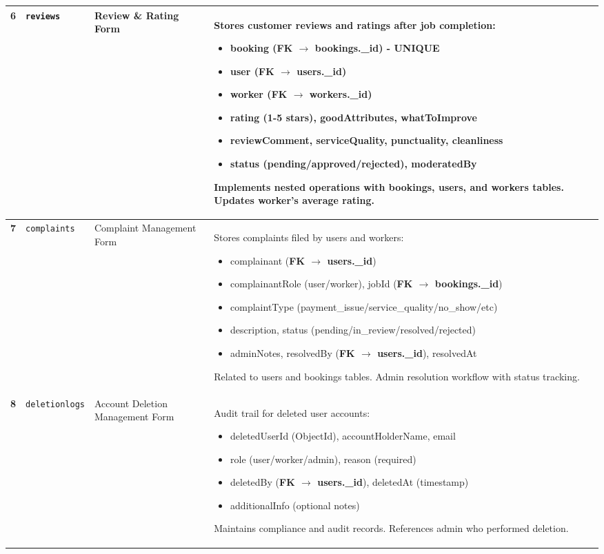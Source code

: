 \documentclass[12pt,a4paper]{article}
\begin{document}
\begin{longtable}{|>{\centering\arraybackslash}p{1cm}|p{3.5cm}|p{4.5cm}|p{6cm}|}
\textbf{6} & \texttt{reviews} & Review \& Rating Form & Stores customer reviews and ratings after job completion:
\begin{itemize}
\item booking (\textbf{FK $\rightarrow$ bookings.\_id}) - UNIQUE
\item user (\textbf{FK $\rightarrow$ users.\_id})
\item worker (\textbf{FK $\rightarrow$ workers.\_id})
\item rating (1-5 stars), goodAttributes, whatToImprove
\item reviewComment, serviceQuality, punctuality, cleanliness
\item status (pending/approved/rejected), moderatedBy
\end{itemize}
Implements nested operations with bookings, users, and workers tables. Updates worker's average rating. \\
\hline

\rowcolor{lightgray}
\textbf{7} & \texttt{complaints} & Complaint Management Form & Stores complaints filed by users and workers:
\begin{itemize}
\item complainant (\textbf{FK $\rightarrow$ users.\_id})
\item complainantRole (user/worker), jobId (\textbf{FK $\rightarrow$ bookings.\_id})
\item complaintType (payment\_issue/service\_quality/no\_show/etc)
\item description, status (pending/in\_review/resolved/rejected)
\item adminNotes, resolvedBy (\textbf{FK $\rightarrow$ users.\_id}), resolvedAt
\end{itemize}
Related to users and bookings tables. Admin resolution workflow with status tracking. \\
\hline

\textbf{8} & \texttt{deletionlogs} & Account Deletion Management Form & Audit trail for deleted user accounts:
\begin{itemize}
\item deletedUserId (ObjectId), accountHolderName, email
\item role (user/worker/admin), reason (required)
\item deletedBy (\textbf{FK $\rightarrow$ users.\_id}), deletedAt (timestamp)
\item additionalInfo (optional notes)
\end{itemize}
Maintains compliance and audit records. References admin who performed deletion. \\
\hline
\end{longtable}
\end{document}
